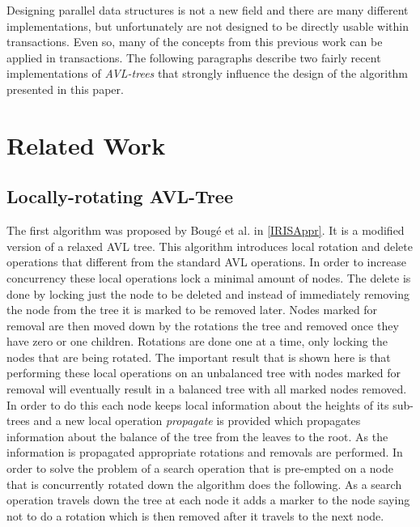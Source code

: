 \documentclass[10pt]{sigplanconf}
\begin{document}
Designing parallel data structures is not a new field and there are many different implementations, but unfortunately are not designed to be directly usable within transactions.
Even so, many of the concepts from this previous work can be applied in transactions.
The following paragraphs describe two fairly recent implementations of \emph{AVL-trees} that strongly influence the design of the algorithm presented in this paper.

\section{Related Work}



\subsection{Locally-rotating AVL-Tree}
The first algorithm was proposed by Boug\'e et al. in \ref{IRISAppr}.
It is a modified version of a relaxed AVL tree.
This algorithm introduces local rotation and delete operations that different from the standard AVL operations.
In order to increase concurrency these local operations lock a minimal amount of nodes.
The delete is done by locking just the node to be deleted and instead of immediately removing the node from the tree it is marked to be removed later.
Nodes marked for removal are then moved down by the rotations the tree and removed once they have zero or one children.
Rotations are done one at a time, only locking the nodes that are being rotated.
The important result that is shown here is that performing these local operations on an unbalanced tree with nodes marked for removal will eventually result in a balanced tree with all marked nodes removed.
In order to do this each node keeps local information about the heights of its sub-trees and a new local operation \emph{propagate} is provided which propagates information about the balance of the tree from the leaves to the root.
As the information is propagated appropriate rotations and removals are performed.
In order to solve the problem of a search operation that is pre-empted on a node that is concurrently rotated down the algorithm does the following.
As a search operation travels down the tree at each node it adds a marker to the node saying not to do a rotation which is then removed after it travels to the next node.
\end{document}

